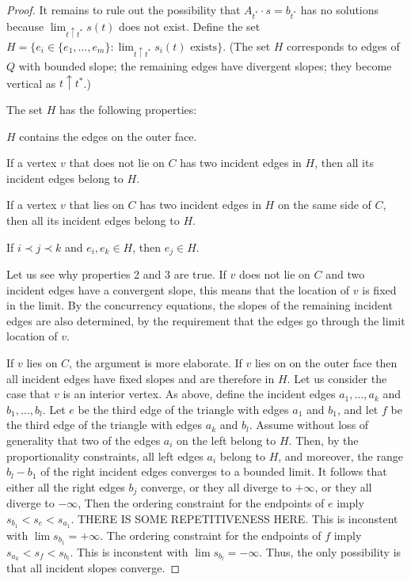 \documentclass{patmorin}
\begin{document}
\begin{proof}
 It remains to rule out the possibility that
 $A_{t^*}\cdot s=b_{t^*}$ has no solutions because
   $\lim_{t\uparrow t^*} s(t)$ does not exist.  Define the set $H=\{e_i\in
   \{e_1,\ldots,e_m\}:\text{$\lim_{t\uparrow t^*} s_i(t)$ exists}\}$.
(The set $H$ corresponds to edges of $Q$
   with
   bounded slope; the remaining edges have divergent slopes; they
   become vertical as $t\uparrow t^*$.)
   \begin{prop}
The set   $H$ has the following
   properties:
   \begin{compactenum}
    \item $H$ contains the edges
      on the outer face.
    \item \label{off-C}
If a vertex $v$ that does not lie on $C$ has two incident edges in
$H$,
then all its incident edges belong to $H$.
    \item \label{on-C}
If a vertex $v$ that lies on $C$ has two incident edges in
$H$ on the same side of $C$,
then all its incident edges belong to $H$.
    \item If $i \prec j \prec k$ and $e_i,e_k\in H$, 
      then $e_j\in H$.
   \end{compactenum}
   \end{prop}
Let us see why properties 2 and 3 are true.
If $v$ does not lie on $C$ and two incident edges have a convergent
slope, this means that the location of $v$ is fixed in the limit.
By the concurrency equations, the slopes of the remaining incident
edges are also determined, by the requirement that the edges go through
the limit location of $v$.

If $v$ lies on $C$, the argument is more elaborate. If $v$ lies on
on the outer face then all incident edges have fixed slopes and are therefore in
$H$.
Let us consider the case that $v$ is an interior vertex.
As above, define the incident edges $a_1,\ldots,a_k$ and $b_1,\ldots,b_l$.
Let $e$ be the third edge of the triangle with edges $a_1$ and $b_1$,
and let 
 $f$ be the third edge of the triangle with edges $a_k$ and $b_l$.
Assume without loss of generality that two of the edges $a_i$ on the
left belong to $H$. Then, by the proportionality constraints, all
left edges $a_i$ belong to $H$, and moreover, the range $b_l-b_1$ of
the right incident edges converges to a bounded limit.
It follows that either all the right edges $b_j$ converge, 
or they all diverge to $+\infty$,
or they all diverge to $-\infty$,
Then the ordering constraint for the endpoints of $e$ imply
\begin{math}
  s_{b_1}<s_e<s_{a_1}
\end{math}.
THERE IS SOME REPETITIVENESS HERE.
This is inconstent with $\lim s_{b_1}=+\infty$.
The ordering constraint for the endpoints of $f$ imply
\begin{math}
  s_{a_k}<s_f<s_{b_l}
\end{math}.
This is inconstent with $\lim s_{b_l}=-\infty$.
Thus, the only possibility is that all incident slopes converge.


\end{proof}
\end{document}
